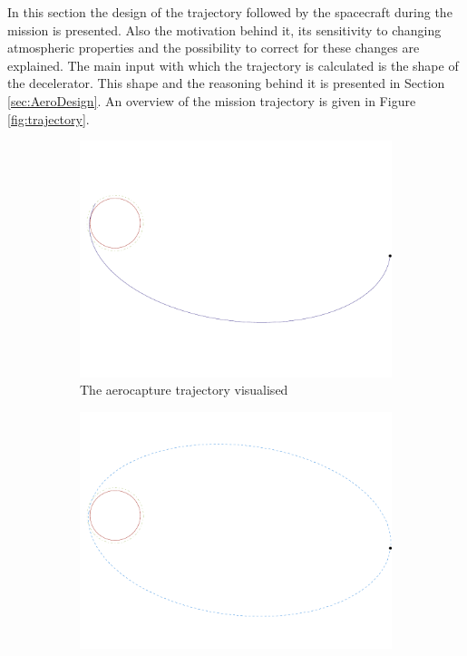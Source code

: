 In this section the design of the trajectory followed by the spacecraft during the mission is presented. Also the motivation behind it, its sensitivity to changing atmospheric properties and the possibility to correct for these changes are explained. The main input with which the trajectory is calculated is the shape of the decelerator. This shape and the reasoning behind it is presented in Section \ref{sec:AeroDesign}. An overview of the mission trajectory is given in Figure \ref{fig:trajectory}.

\begin{figure}
	\centering
	
	\begin{subfigure}[b]{0.7\textwidth}
		\vspace{-22mm}
		\includegraphics[width=\textwidth]{./Figure/Orbit/aerocapture_trajectory.pdf}
		\vspace{-25mm}
		\caption{The aerocapture trajectory visualised}
		\label{fig:capture_trajectory}
	\end{subfigure}
	\begin{subfigure}[b]{0.7\textwidth}
		\vspace{-10mm}
		\includegraphics[width=\textwidth]{./Figure/Orbit/parking_trajectory.pdf}

\end{subfigure}
\end{figure}
